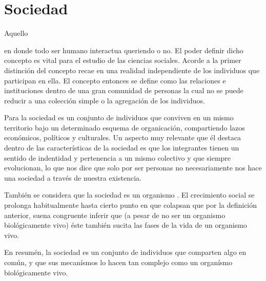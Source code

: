 \documentclass[stu, 12pt, letterpaper, donotrepeattitle, floatsintext, natbib]{apa7}
\begin{document}
\section{Sociedad}
Aquello \begin{justifying}en donde todo ser humano interactua queriendo o no. El poder definir dicho concepto es vital para el estudio de las ciencias sociales.
Acorde a \cite{thompson-2017}
la primer distinción del concepto recae en una realidad independiente de los individuos que participan en ella. El concepto entonces se define como las relaciones
e instituciones dentro de una gran comunidad de personas la cual no se puede reducir a una colección simple o la agregación de los individuos.\par
\vspace{\baselineskip}
Para \cite{westreicher-2021}
la sociedad es un conjunto de individuos que conviven en un mismo territorio bajo un determinado esquema de organicación, compartiendo lazos económicos, políticos y culturales. Un aspecto muy relevante que 
él destaca dentro de las características de la sociedad es que los integrantes tienen un sentido de indentidad y pertenencia a un mismo colectivo y que siempre evolucionan, lo que nos dice que solo por ser personas no necesariamente nos 
hace una sociedad a través de nuestra existencia.\par
\vspace{\baselineskip}
También se considera que la sociedad es un organismo \citep{spencer-2004}.
El crecimiento social se prolonga habitualmente hasta cierto punto en que colapsan que por la definición anterior, suena congruente
inferir que (a pesar de no ser un organismo biológicamente vivo) éste también sucita las fases de la vida de un organismo vivo.\par
\vspace{\baselineskip}
En resumén, la sociedad es un conjunto de individuos que comparten algo en común, y que sus mecanísmos lo hacen tan complejo como un organísmo biológicamente vivo.\par\end{justifying}
\vspace{\baselineskip}
\end{document}
